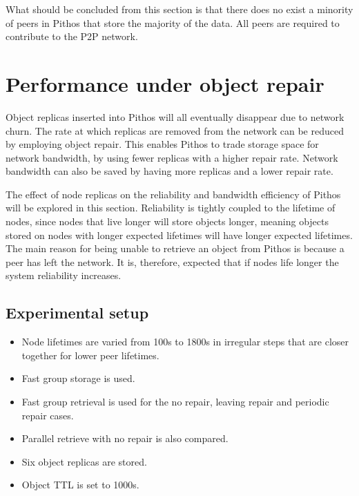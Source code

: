 What should be concluded from this section is that there does no exist a minority of peers in Pithos that store the majority of the data. All peers are required to contribute to the P2P network.

\section{Performance under object repair}
\label{repair_results}

Object replicas inserted into Pithos will all eventually disappear due to network churn. The rate at which replicas are removed from the network can be reduced by employing object repair. This enables Pithos to trade storage space for network bandwidth, by using fewer replicas with a higher repair rate. Network bandwidth can also be saved by having more replicas and a lower repair rate.

The effect of node replicas on the reliability and bandwidth efficiency of Pithos will be explored in this section. Reliability is tightly coupled to the lifetime of nodes, since nodes that live longer will store objects longer, meaning objects stored on nodes with longer expected lifetimes will have longer expected lifetimes. The main reason for being unable to retrieve an object from Pithos is because a peer has left the network. It is, therefore, expected that if nodes life longer the system reliability increases.

\subsection{Experimental setup}

\begin{itemize}
\item Node lifetimes are varied from 100s to 1800s in irregular steps that are closer together for lower peer lifetimes.

\item Fast group storage is used.

\item Fast group retrieval is used for the no repair, leaving repair and periodic repair cases.

\item Parallel retrieve with no repair is also compared.

\item Six object replicas are stored.

\item Object TTL is set to 1000s.
\end{itemize}

